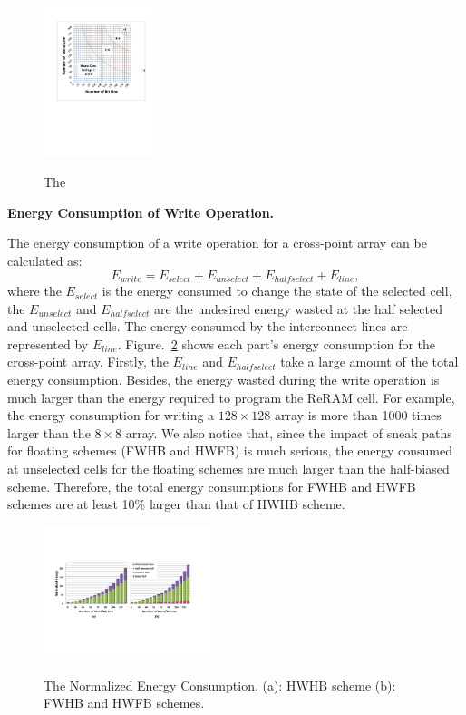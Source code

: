 \begin{figure}%
\centering
  \includegraphics[width=0.3\textwidth]{./figures/Theoretical_bound.pdf}\\
  \caption{The }\label{fig:half}
\end{figure}



\vspace{10pt} \textbf{Energy Consumption of Write Operation.} \vspace{8pt}

The energy consumption of a write operation for a cross-point array can be calculated as:
\begin{equation}
E_{write} = E_{select} + E_{unselect} + E_{halfselect} + E_{line},
\end{equation}
where the $E_{select}$ is the energy consumed to change the state of the
selected cell, the $E_{unselect}$ and $E_{halfselect}$ are the undesired energy wasted at the half selected and unselected cells. The energy consumed by the interconnect lines are represented by $E_{line}$. Figure.~\ref{fig:energy} shows each part's energy consumption for the cross-point array. Firstly, the $E_{line}$ and $E_{halfselect}$ take a large amount of the total energy consumption. Besides, the energy wasted during the write operation is much larger than the energy required to program the ReRAM cell. For example, the energy consumption for writing a $128{\times}128$ array is more than 1000 times larger than the $8{\times}8$ array. We also notice that, since the impact of sneak paths for floating schemes (FWHB and HWFB) is much serious, the energy consumed at unselected cells for the floating schemes are much larger than the half-biased scheme. Therefore, the total energy consumptions for FWHB and HWFB schemes are at least 10\% larger than that of HWHB scheme.


\begin{figure}%
\centering
  \includegraphics[width=0.45\textwidth]{./figures/energy4.pdf}\\
  \caption{The Normalized Energy Consumption. (a): HWHB scheme (b): FWHB and HWFB schemes.}\label{fig:energy}
\end{figure}


